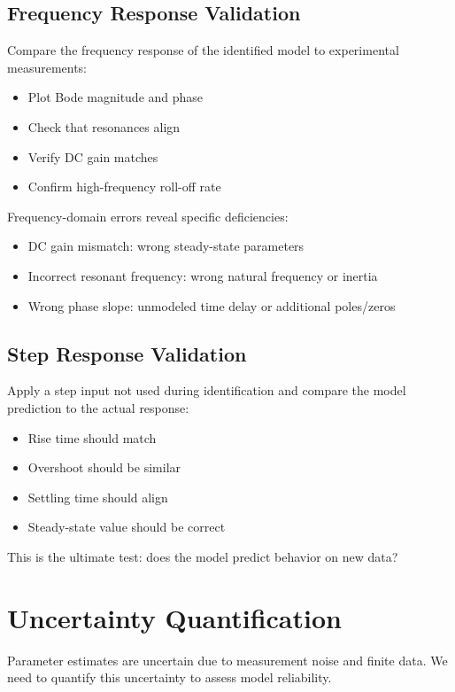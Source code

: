 \subsection{Frequency Response Validation}

Compare the frequency response of the identified model to experimental measurements:
\begin{itemize}
    \item Plot Bode magnitude and phase
    \item Check that resonances align
    \item Verify DC gain matches
    \item Confirm high-frequency roll-off rate
\end{itemize}

Frequency-domain errors reveal specific deficiencies:
\begin{itemize}
    \item DC gain mismatch: wrong steady-state parameters
    \item Incorrect resonant frequency: wrong natural frequency or inertia
    \item Wrong phase slope: unmodeled time delay or additional poles/zeros
\end{itemize}

\subsection{Step Response Validation}

Apply a step input not used during identification and compare the model prediction to the actual response:
\begin{itemize}
    \item Rise time should match
    \item Overshoot should be similar
    \item Settling time should align
    \item Steady-state value should be correct
\end{itemize}

This is the ultimate test: does the model predict behavior on new data?

\section{Uncertainty Quantification}

Parameter estimates are uncertain due to measurement noise and finite data. We need to quantify this uncertainty to assess model reliability.

